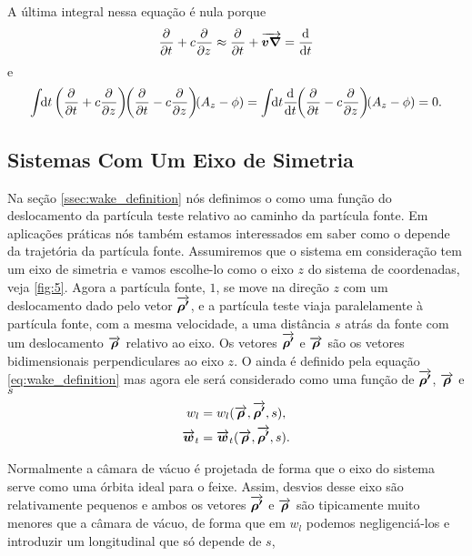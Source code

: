 \documentclass[
	12pt,				%
	openright,			%
	oneside,			%
	a4paper,		%
	chapter=TITLE,		%
	section=TITLE,		%
    brazil,				%
	english,			%
	sumario=tradicional,
	]{abntex2}
\begin{document}
A última integral nessa equação é nula porque
\begin{equation}
    \frac{\partial^{{}}}{\partial t^{{}}} + c\frac{\partial^{{}}}{\partial z^{{}}} \approx \frac{\partial^{{}}}{\partial t^{{}}} + \overrightarrow{\boldsymbol{v\nabla}} = \frac{\mathrm{d}^{{}}}{\mathrm{d} t^{{}}}
\end{equation}
e
\begin{equation}
  \udefint{t}{\left(\derpar{}{t} + c\derpar{}{z}\right)\!\!
             \left(\derpar{}{t} - c\derpar{}{z}\right)\!\!(A_z - \phi)}
  = \udefint{t}{\dertot{}{t}\!\!\left(\derpar{}{t}-c\derpar{}{z}\right)\!\!(A_z - \phi)}
  =  0.
\end{equation}

\subsection{Sistemas Com Um Eixo de Simetria}
Na seção \ref{ssec:wake_definition} nós definimos o  como uma função do deslocamento da partícula teste relativo ao caminho da partícula fonte. Em aplicações práticas nós também estamos interessados em saber como o  depende da trajetória da partícula fonte. Assumiremos que o sistema em consideração tem um eixo de simetria e vamos escolhe-lo como o eixo $z$ do sistema de coordenadas, veja \ref{fig:5}. Agora a partícula fonte, $1$, se move na direção $z$ com um deslocamento dado pelo vetor $\overrightarrow{\boldsymbol{\rho'}}$, e a partícula teste viaja paralelamente à partícula fonte, com a mesma velocidade, a uma distância $s$ atrás da fonte com um deslocamento $\overrightarrow{\boldsymbol{\rho}}$ relativo ao eixo. Os vetores $\overrightarrow{\boldsymbol{\rho'}}$ e $\overrightarrow{\boldsymbol{\rho}}$ são os vetores bidimensionais perpendiculares ao eixo $z$. O  ainda é definido pela equação \eqref{eq:wake_definition} mas agora ele será considerado como uma função de $\overrightarrow{\boldsymbol{\rho'}}$, $\overrightarrow{\boldsymbol{\rho}}$ e $s$
\begin{equation}\begin{aligned}
w_l &= w_l(\overrightarrow{\boldsymbol{\rho}},\overrightarrow{\boldsymbol{\rho'}},s), \\
\overrightarrow{\boldsymbol{w}}_t &= \overrightarrow{\boldsymbol{w}}_t(\overrightarrow{\boldsymbol{\rho}},\overrightarrow{\boldsymbol{\rho'}},s).
\end{aligned}\end{equation}

Normalmente a câmara de vácuo é projetada de forma que o eixo do sistema serve como uma órbita ideal para o feixe. Assim, desvios desse eixo são relativamente pequenos e ambos os vetores $\overrightarrow{\boldsymbol{\rho'}}$ e $\overrightarrow{\boldsymbol{\rho}}$ são tipicamente muito menores que a câmara de vácuo, de forma que em $w_l$ podemos negligenciá-los e introduzir um  longitudinal que só depende de $s$,
\end{document}
